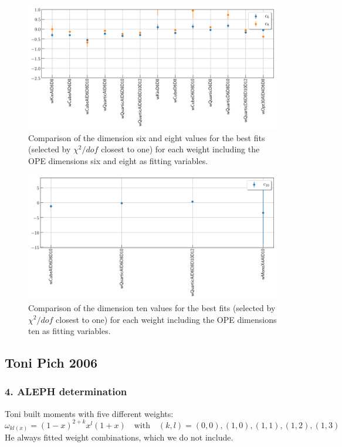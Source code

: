 \documentclass[../../index.tex]{subfiles}
\begin{document}
\begin{figure}[H]
  \includegraphics[width=\textwidth]{./images/comparisonD6D8.png}
  \caption{Comparison of the dimension six and eight values for the best fits (selected by
    $\chi^2/dof$ closest to one) for each weight including the OPE dimensions
    six and eight as fitting variables.}
\end{figure}
\begin{figure}[H]
  \includegraphics[width=\textwidth]{./images/comparisonD10.png}
  \caption{Comparison of the dimension ten values for the best fits (selected by
    $\chi^2/dof$ closest to one) for each weight including the OPE dimensions
    ten as fitting variables.}
\end{figure}


\newpage
\subsection{Toni Pich 2006}
\subsubsection{4. ALEPH determination}
Toni built moments with five different weights:
\begin{equation}
  \omega_{kl(x)} = ( 1 - x )^{2+k} x^l (1+x) \quad \text{with} \quad (k,l) = {(0,0), (1,0), (1,1), (1,2), (1,3)}
\end{equation}
He always fitted weight combinations, which we do not include.
\end{document}
